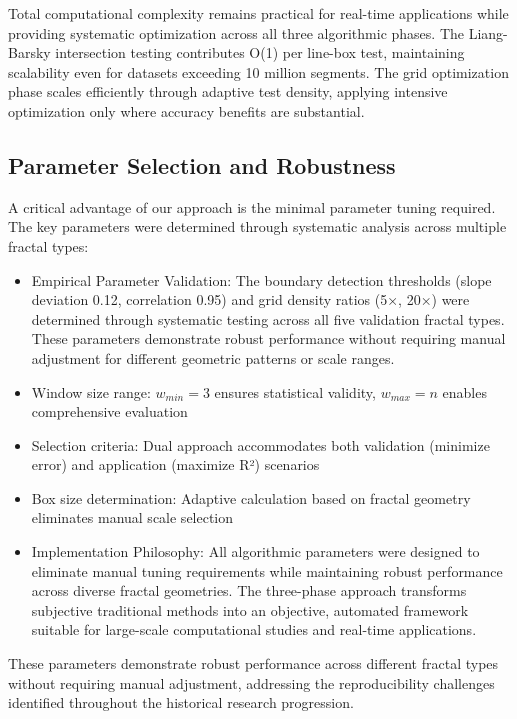 \documentclass[preprint,12pt]{elsarticle}
\def\textbf#1{#1}%
\begin{document}
Total computational complexity remains practical for real-time applications while providing systematic optimization across all three algorithmic phases. The Liang-Barsky intersection testing contributes O(1) per line-box test, maintaining scalability even for datasets exceeding 10 million segments. The grid optimization phase scales efficiently through adaptive test density, applying intensive optimization only where accuracy benefits are substantial.

\subsection{Parameter Selection and Robustness}

A critical advantage of our approach is the minimal parameter tuning required. The key parameters were determined through systematic analysis across multiple fractal types:

\begin{itemize}
\item \textbf{Empirical Parameter Validation}: The boundary detection thresholds (slope deviation 0.12, correlation 0.95) and grid density ratios (5×, 20×) were determined through systematic testing across all five validation fractal types. These parameters demonstrate robust performance without requiring manual adjustment for different geometric patterns or scale ranges.
\item \textbf{Window size range}: $w_{min} = 3$ ensures statistical validity, $w_{max} = n$ enables comprehensive evaluation
\item \textbf{Selection criteria}: Dual approach accommodates both validation (minimize error) and application (maximize R²) scenarios
\item \textbf{Box size determination}: Adaptive calculation based on fractal geometry eliminates manual scale selection
\item \textbf{Implementation Philosophy}: All algorithmic parameters were designed to eliminate manual tuning requirements while maintaining robust performance across diverse fractal geometries. The three-phase approach transforms subjective traditional methods into an objective, automated framework suitable for large-scale computational studies and real-time applications.
\end{itemize}

These parameters demonstrate robust performance across different fractal types without requiring manual adjustment, addressing the reproducibility challenges identified throughout the historical research progression.
\end{document}
